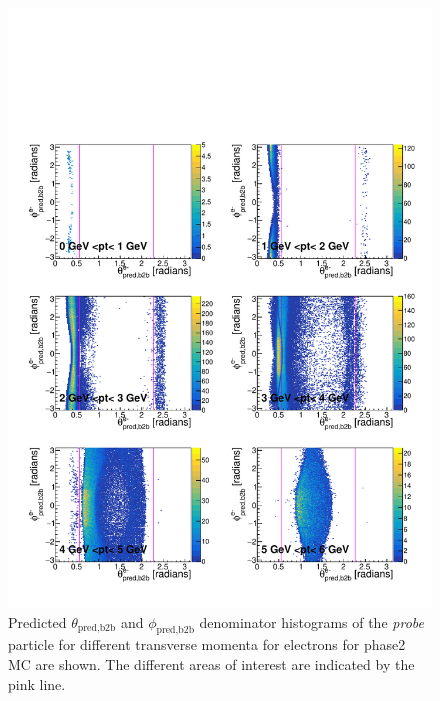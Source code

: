 \documentclass[a4paper,11pt,twosided,final,german,openbib,pdftex,listof=totoc,bibliography=totoc]{scrbook}
\begin{document}
\begin{appendix}
\begin{figure}[h!]
	\includegraphics[width=\textwidth]{Plots/master/RTPtMemE_MC.pdf}
	\caption[Enumerator $\theta_{\textrm{pred,b2b}}$-$\phi_{\textrm{pred,b2b}}$ Electron Transverse Momentum Phase2 MC]{Predicted $\theta_{\textrm{pred,b2b}}$ and $\phi_{\textrm{pred,b2b}}$ denominator histograms of the \textit{probe} particle for different transverse momenta for electrons for phase2 MC are shown. The different areas of interest are indicated by the pink line.}
	\label{plt:RTPtMemE_MC}
\end{figure}



\end{appendix}
\end{document}

